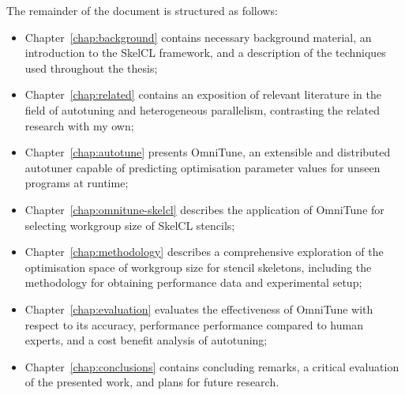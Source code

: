 The remainder of the document is structured as follows:

\begin{itemize}
\item Chapter~\ref{chap:background} contains necessary background
  material, an introduction to the SkelCL framework, and a description
  of the techniques used throughout the thesis;
\item Chapter~\ref{chap:related} contains an exposition of relevant
  literature in the field of autotuning and heterogeneous parallelism,
  contrasting the related research with my own;
\item Chapter~\ref{chap:autotune} presents OmniTune, an extensible and
  distributed autotuner capable of predicting optimisation parameter
  values for unseen programs at runtime;
\item Chapter~\ref{chap:omnitune-skelcl} describes the application of
  OmniTune for selecting workgroup size of SkelCL stencils;
\item Chapter~\ref{chap:methodology} describes a comprehensive
  exploration of the optimisation space of workgroup size for stencil
  skeletons, including the methodology for obtaining performance data
  and experimental setup;
\item Chapter~\ref{chap:evaluation} evaluates the effectiveness of
  OmniTune with respect to its accuracy, performance performance
  compared to human experts, and a cost benefit analysis of
  autotuning;
\item Chapter~\ref{chap:conclusions} contains concluding remarks, a
  critical evaluation of the presented work, and plans for future
  research.
\end{itemize}
